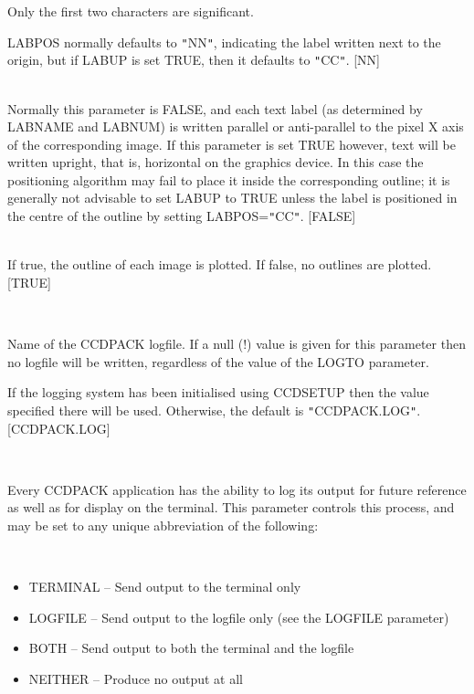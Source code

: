 \documentclass[twoside,11pt]{article}
\renewcommand{\_}{\texttt{\symbol{95}}}
\newcommand{\sstsubsection}[1]{ \item[{#1}] \mbox{} \\}
\newcommand{\sstitemlist}[1]{
  \mbox{} \\
  \vspace{-3.5ex}
  \begin{itemize}
     #1
  \end{itemize}
}
\newcommand{\sstitem}{\item}
\newcommand{\sstsubsection}[1]{\item[{#1}]}
\newcommand{\sstitemlist}[1]{
      \begin{itemize}
         #1
      \end{itemize}
      \\
   }
\newcommand{\sstitem}{\item}
\begin{document}
{{{         Only the first two characters are significant.

         LABPOS normally defaults to {\tt "}NN{\tt "}, indicating the label written
         next to the origin, but if LABUP is set TRUE, then it
         defaults to {\tt "}CC{\tt "}.
         [NN]
      }
      \sstsubsection{
         LABUP = \_LOGICAL (Read)
      }{
         Normally this parameter is FALSE, and each text label (as
         determined by LABNAME and LABNUM) is written parallel or
         anti-parallel to the pixel X axis of the corresponding image.
         If this parameter is set TRUE however, text will be written
         upright, that is, horizontal on the graphics device.
         In this case the positioning algorithm may fail to place it
         inside the corresponding outline; it is generally not advisable
         to set LABUP to TRUE unless the label is positioned in the
         centre of the outline by setting LABPOS={\tt "}CC{\tt "}.
         [FALSE]
      }
      \sstsubsection{
         LINES = \_LOGICAL (Read)
      }{
         If true, the outline of each image is plotted.  If false, no
         outlines are plotted.
         [TRUE]
      }
      \sstsubsection{
         LOGFILE = FILENAME (Read)
      }{
         Name of the CCDPACK logfile.  If a null (!) value is given for
         this parameter then no logfile will be written, regardless of
         the value of the LOGTO parameter.

         If the logging system has been initialised using CCDSETUP
         then the value specified there will be used. Otherwise, the
         default is {\tt "}CCDPACK.LOG{\tt "}.
         [CCDPACK.LOG]
      }
      \sstsubsection{
         LOGTO = LITERAL (Read)
      }{
         Every CCDPACK application has the ability to log its output
         for future reference as well as for display on the terminal.
         This parameter controls this process, and may be set to any
         unique abbreviation of the following:
         \sstitemlist{

            \sstitem
               TERMINAL  -- Send output to the terminal only

            \sstitem
               LOGFILE   -- Send output to the logfile only (see the
                               LOGFILE parameter)

            \sstitem
               BOTH      -- Send output to both the terminal and the
                               logfile

            \sstitem
               NEITHER   -- Produce no output at all

}}}}
\end{document}
